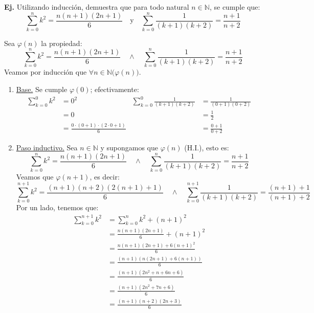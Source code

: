 \documentclass[letterpaper,DIV=14,headsepline,12pt]{scrartcl}
\makeatletter
\newcounter{Ejer}
\newcommand{\pts}{}
\newenvironment{ejercicio}[1]{\noindent
    \ifthenelse{\equal{#1}{1}}{\renewcommand{\pts}{\textbf{(#1 pt)}}}{\renewcommand{\pts}{\textbf{(#1 pts)}}}\textbf{Ej. \theEjer} \pts\stepcounter{Ejer}}{\vspace{.3cm}}
\renewenvironment{proof}[1][]{%
        \par\pushQED{\qed}%
        \normalfont\topsep6pt \partopsep0pt %
        \trivlist
        \item[\hskip\labelsep
                \textbf{\textit{Demostración.}}%
        ]#1
        }{%
        \popQED\endtrivlist\@endpefalse
    }
\makeatother
\begin{document}
    \begin{ejercicio}{2}
        Utilizando inducción, demuestra que para todo natural $n \in \mathbb{N}$, se cumple que:
        \[ \sum_{k=0}^{n} k^2 = \frac{n(n+1)(2n+1)}{6} \quad \text{y} \quad \sum_{k=0}^{n} \frac{1}{(k+1)(k+2)} = \frac{n+1}{n+2} \]
    \end{ejercicio}
    \begin{proof}
        Sea $\varphi(n)$ la propiedad:
        \[ \sum_{k=0}^{n} k^2 = \frac{n(n+1)(2n+1)}{6} \quad \land \quad \sum_{k=0}^{n} \frac{1}{(k+1)(k+2)} = \frac{n+1}{n+2} \]
        Veamos por inducción que $\forall n \in \mathbb{N} \big( \varphi(n) \big)$.
        \begin{enumerate}[\hspace{1cm}]
            \item \underline{Base.} Se cumple $\varphi(0)$; efectivamente:
            \begin{align*}
                \sum_{k=0}^{0} k^2 &= 0^2 & \sum_{k=0}^{0} \frac{1}{(k+1)(k+2)} & = \frac{1}{(0+1)(0+2)} \\
                & = 0 & & = \frac{1}{2} \\
                & = \frac{0 \cdot (0+1) \cdot (2\cdot 0 + 1)}{6} & & = \frac{0+1}{0+2}
            \end{align*}
            \item \underline{Paso inductivo.} Sea $n \in \mathbb{N}$ y supongamos que $\varphi(n)$ (H.I.), esto es:
            \[ \sum_{k=0}^{n} k^2 = \frac{n(n+1)(2n+1)}{6} \quad \land \quad \sum_{k=0}^{n} \frac{1}{(k+1)(k+2)} = \frac{n+1}{n+2} \]
            Veamos que $\varphi(n+1)$, es decir:
            \[ \sum_{k=0}^{n+1} k^2 = \frac{(n+1)(n+2)(2(n+1)+1)}{6} \quad \land \quad \sum_{k=0}^{n+1} \frac{1}{(k+1)(k+2)} = \frac{(n+1)+1}{(n+1)+2} \]
            Por un lado, tenemos que:
            \begin{align*}
                \sum_{k=0}^{n+1} k^2 &= \sum_{k=0}^{n} k^2 + (n+1)^2 \\
                &= \frac{n(n+1)(2n+1)}{6} + (n+1)^2 \tag{por H.I.} \\
                &= \frac{n(n+1)(2n+1) + 6(n+1)^2}{6} \\
                &= \frac{(n+1)(n(2n+1) + 6(n+1))}{6} \\
                &= \frac{(n+1)(2n^2 + n + 6n + 6)}{6} \\
                &= \frac{(n+1)(2n^2 + 7n + 6)}{6} \\
                &= \frac{(n+1)(n+2)(2n+3)}{6} \\

\end{align*}
\end{enumerate}
\end{proof}
\end{document}
